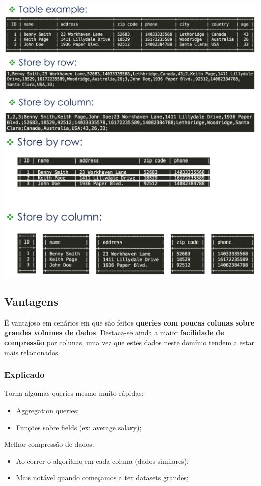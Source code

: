 \documentclass{article}
\begin{document}
\begin{center}
  \includegraphics[scale=0.3]{10}
  \includegraphics[scale=0.3]{11}
\end{center}

\pagebreak

\subsection{Vantagens}
É vantajoso em cenários em que são feitos \textbf{queries com poucas colunas sobre
grandes volumes de dados}. Destaca-se ainda a maior \textbf{facilidade de compressão} por colunas,
uma vez que estes dados neste domínio tendem a estar mais relacionados.

\subsubsection{Explicado}
Torna algumas queries mesmo muito rápidas:
\begin{itemize}
  \item Aggregation queries;
  \item Funções sobre fields (ex: average salary);
\end{itemize}
Melhor compressão de dados:
\begin{itemize}
  \item Ao correr o algoritmo em cada coluna (dados similares);
  \item Mais notável quando começamos a ter datasets grandes;
\end{itemize}
\end{document}
